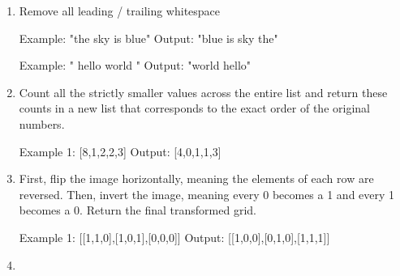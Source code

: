 \begin{enumerate}
\begin{console}
Example 2: num1 = "123", num2 = "456"
Output:    "56088"
\end{console}\newpage

\item {}

Remove all leading / trailing whitespace
\begin{console}
Example: "the sky is blue" 
Output:  "blue is sky the"

Example: "  hello world  " 
Output:  "world hello" 
\end{console}\newpage

\item {}

Count all the strictly smaller values across the entire list and return these counts in a new list that corresponds to the exact order of the original numbers.

\begin{console}
Example 1: [8,1,2,2,3] 
Output:    [4,0,1,1,3]
\end{console}\newpage

\item {}

First, flip the image horizontally, meaning the elements of each row are reversed. Then, invert the image, meaning every 0 becomes a 1 and every 1 becomes a 0. Return the final transformed grid.

\begin{console}
Example 1: [[1,1,0],[1,0,1],[0,0,0]] 
Output:    [[1,0,0],[0,1,0],[1,1,1]]
\end{console}\newpage

\item {}


\end{enumerate}
